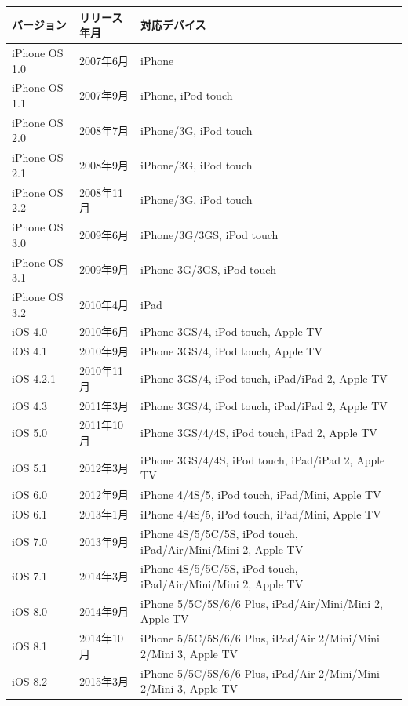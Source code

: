 \begin{table}[tb]
\begin{center}
\begin{tabular}{|l|l|p{10cm}|} \hline
バージョン & リリース年月 & 対応デバイス \\ \hline \hline
iPhone OS 1.0 & 2007年6月 & iPhone \\ \hline
iPhone OS 1.1 & 2007年9月 & iPhone, iPod touch \\ \hline
iPhone OS 2.0 & 2008年7月 & iPhone/3G, iPod touch \\ \hline
iPhone OS 2.1 & 2008年9月 & iPhone/3G, iPod touch \\ \hline
iPhone OS 2.2 & 2008年11月 & iPhone/3G, iPod touch \\ \hline
iPhone OS 3.0 & 2009年6月 & iPhone/3G/3GS, iPod touch \\ \hline
iPhone OS 3.1 & 2009年9月 & iPhone 3G/3GS, iPod touch \\ \hline
iPhone OS 3.2 & 2010年4月 & iPad \\ \hline
iOS 4.0 & 2010年6月 & iPhone 3GS/4, iPod touch, Apple TV \\ \hline
iOS 4.1 & 2010年9月 & iPhone 3GS/4, iPod touch, Apple TV \\ \hline
iOS 4.2.1 & 2010年11月 & iPhone 3GS/4, iPod touch, iPad/iPad 2, Apple TV \\ \hline
iOS 4.3 & 2011年3月 & iPhone 3GS/4, iPod touch, iPad/iPad 2, Apple TV \\ \hline
iOS 5.0 & 2011年10月 & iPhone 3GS/4/4S, iPod touch, iPad 2, Apple TV \\ \hline
iOS 5.1 & 2012年3月 & iPhone 3GS/4/4S, iPod touch, iPad/iPad 2, Apple TV \\ \hline
iOS 6.0 & 2012年9月 & iPhone 4/4S/5, iPod touch, iPad/Mini, Apple TV \\ \hline
iOS 6.1 & 2013年1月 & iPhone 4/4S/5, iPod touch, iPad/Mini, Apple TV \\ \hline
iOS 7.0 & 2013年9月 & iPhone 4S/5/5C/5S, iPod touch, iPad/Air/Mini/Mini 2, Apple TV \\ \hline
iOS 7.1 & 2014年3月 & iPhone 4S/5/5C/5S, iPod touch, iPad/Air/Mini/Mini 2, Apple TV \\ \hline
iOS 8.0 & 2014年9月 & iPhone 5/5C/5S/6/6 Plus, iPad/Air/Mini/Mini 2, Apple TV \\ \hline
iOS 8.1 & 2014年10月 & iPhone 5/5C/5S/6/6 Plus, iPad/Air 2/Mini/Mini 2/Mini 3, Apple TV \\ \hline
iOS 8.2 & 2015年3月 & iPhone 5/5C/5S/6/6 Plus, iPad/Air 2/Mini/Mini 2/Mini 3, Apple TV \\ \hline

\end{tabular}
\end{center}
\end{table}
